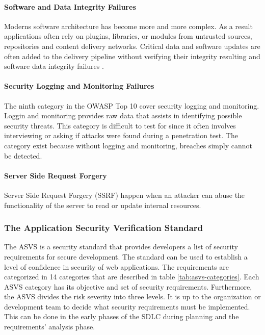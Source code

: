 \paragraph{Software and Data Integrity Failures}
Moderns software architecture has become more and more complex. As a result applications often rely on plugins, libraries, or modules from untrusted sources, repositories and content delivery networks. Critical data and software updates are often added to the delivery pipeline without verifying their integrity resulting and software data integrity failures \cite{site:A08_2022}.

\paragraph{Security Logging and Monitoring Failures}
The ninth category in the OWASP Top 10 cover security logging and monitoring. Loggin and monitoring provides raw data that assists in identifying possible security threats. This category is difficult to test for since it often involves interviewing or asking if attacks were found during a penetration test. The category exist because without logging and monitoring, breaches simply cannot be detected.

\paragraph{Server Side Request Forgery}
Server Side Request Forgery (SSRF) happen when an attacker can abuse the functionality of the server to read or update internal resources.

\subsubsection{The Application Security Verification Standard}
The ASVS is a security standard that provides developers a list of security requirements for secure development. The standard can be used to establish a level of confidence in security of web applications. The requirements are categorized in 14 categories that are described in table \ref{tab:asvs-categories}. Each ASVS category has its objective and set of security requirements. Furthermore, the ASVS divides the risk severity into three levels. It is up to the organization or development team to decide what security requirements must be implemented. This can be done in the early phases of the SDLC during planning and the requirements' analysis phase.

